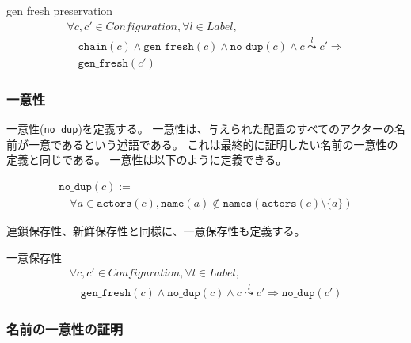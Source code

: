 \begin{lemma}{gen fresh preservation}
\begin{displaymath}
  \begin{array}{l}
    \forall c, c' \in \textit{Configuration}, \forall l \in \textit{Label}, \\
    \quad \texttt{chain}(c) \wedge \texttt{gen\_fresh}(c) \wedge \texttt{no\_dup}(c) \wedge c \overset{l}{\leadsto} c' \Rightarrow \\
    \quad \texttt{gen\_fresh}(c')
  \end{array}
\end{displaymath}
\end{lemma}

\subsubsection{一意性}

一意性(\texttt{no\_dup})を定義する。
一意性は、与えられた配置のすべてのアクターの名前が一意であるという述語である。
これは最終的に証明したい名前の一意性の定義と同じである。
一意性は以下のように定義できる。

\begin{displaymath}
  \begin{array}{l}
    \texttt{no\_dup}(c) := \\
    \quad \forall a \in \texttt{actors}(c), \texttt{name}(a) \notin
    \texttt{names}(\texttt{actors}(c) \setminus \{a\})
  \end{array}
\end{displaymath}

連鎖保存性、新鮮保存性と同様に、一意保存性も定義する。

\begin{lemma}{一意保存性}
\begin{displaymath}
  \begin{array}{l}
    \forall c, c' \in \textit{Configuration}, \forall l \in \textit{Label}, \\
    \quad \texttt{gen\_fresh}(c) \wedge \texttt{no\_dup}(c) \wedge c \overset{l}{\leadsto} c' \Rightarrow \texttt{no\_dup}(c')
  \end{array}
\end{displaymath}
\end{lemma}

\subsubsection{名前の一意性の証明}

